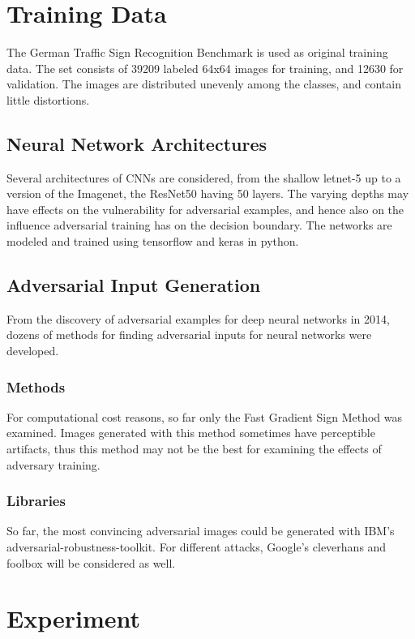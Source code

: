 \documentclass[draft,final]{vutinfth} %
\begin{document}
\section{Training Data}

The German Traffic Sign Recognition Benchmark is used as original training data. The set consists of 39209 labeled 64x64 images for training, and 12630 for validation. The images are distributed unevenly among the classes, and contain little distortions.

\subsection{Neural Network Architectures}

Several architectures of CNNs are considered, from the shallow letnet-5 up to a version of the Imagenet, the ResNet50 having 50 layers. The varying depths may have effects on the vulnerability for adversarial examples, and hence also on the influence adversarial training has on the decision boundary. The networks are modeled and trained using tensorflow and keras in python.

\subsection{Adversarial Input Generation}

From the discovery of adversarial examples for deep neural networks in 2014, dozens of methods for finding adversarial inputs for neural networks were developed.

\subsubsection{Methods}
For computational cost reasons, so far only the Fast Gradient Sign Method was examined. Images generated with this method sometimes have perceptible artifacts, thus this method may not be the best for examining the effects of adversary training.

\subsubsection{Libraries}

So far, the most convincing adversarial images could be generated with IBM's adversarial-robustness-toolkit. For different attacks, Google's cleverhans and foolbox will be considered as well.

\section{Experiment}
\end{document}
